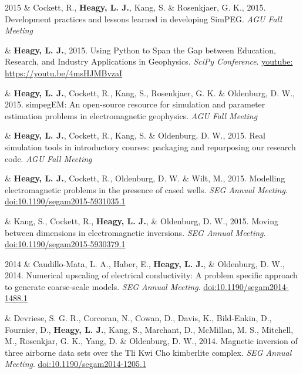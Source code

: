 \documentclass[a4paper, 11pt]{article}
\newcommand{\doi}[1]{\href{https://doi.org/#1}{doi:#1}}
\newcommand{\youtube}[1]{\href{https://youtu.be/XY3Tq9Wd1\_A}{youtube: #1}}
\begin{document}
\begin{entryright}
2015 & Cockett, R., \textbf{Heagy, L. J.}, Kang, S. \& Rosenkjaer, G. K., 2015. Development practices and lessons learned in developing SimPEG. \emph{AGU Fall Meeting}
\end{entryright}

\begin{entryright}
& \textbf{Heagy, L. J.}, 2015. Using Python to Span the Gap between Education, Research, and Industry Applications in Geophysics. \emph{SciPy Conference}. \youtube{https://youtu.be/4msHJMBvzaI}
\end{entryright}

\begin{entryright}
& \textbf{Heagy, L. J.}, Cockett, R., Kang, S., Rosenkjaer, G. K. \& Oldenburg, D. W., 2015. simpegEM: An open-source resource for simulation and parameter estimation problems in electromagnetic geophysics. \emph{AGU Fall Meeting}
\end{entryright}

\begin{entryright}
& \textbf{Heagy, L. J.}, Cockett, R., Kang, S. \& Oldenburg, D. W., 2015. Real simulation tools in introductory courses: packaging and repurposing our research code. \emph{AGU Fall Meeting}
\end{entryright}

\begin{entryright}
& \textbf{Heagy, L. J.}, Cockett, R., Oldenburg, D. W. \& Wilt, M., 2015. Modelling electromagnetic problems in the presence of cased wells. \emph{SEG Annual Meeting}. \doi{10.1190/segam2015-5931035.1}
\end{entryright}

\begin{entryright}
& Kang, S., Cockett, R., \textbf{Heagy, L. J.}, \& Oldenburg, D. W., 2015. Moving between dimensions in electromagnetic inversions. \emph{SEG Annual Meeting}. \doi{10.1190/segam2015-5930379.1}
\end{entryright}

\begin{entryright}
2014 & Caudillo-Mata, L. A., Haber, E., \textbf{Heagy, L. J.}, \& Oldenburg, D. W., 2014. Numerical upscaling of electrical conductivity: A problem specific approach to generate coarse-scale models. \emph{SEG Annual Meeting}. \doi{10.1190/segam2014-1488.1}
\end{entryright}

\begin{entryright}
& Devriese, S. G. R., Corcoran, N., Cowan, D., Davis, K., Bild-Enkin, D., Fournier, D., \textbf{Heagy, L. J.}, Kang, S., Marchant, D., McMillan, M. S., Mitchell, M., Rosenkjar, G. K., Yang, D. \& Oldenburg, D. W., 2014. Magnetic inversion of three airborne data sets over the Tli Kwi Cho kimberlite complex. \emph{SEG Annual Meeting}. \doi{10.1190/segam2014-1205.1}
\end{entryright}
\end{document}
